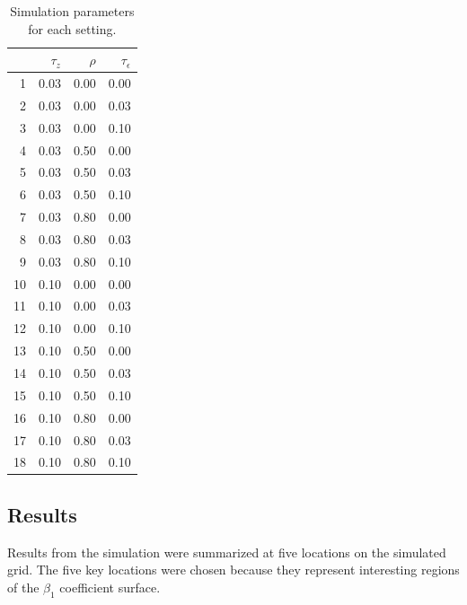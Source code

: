 \documentclass[authoryear, review, 11pt]{elsarticle}
\begin{document}
	
	
\begin{table}[h!]
	\begin{center}
	\begin{tabular}{rrrr}
		\hline
		& $\tau_z$ & $\rho$ & $\tau_{\epsilon}$ \\ 
		\hline
		1 & 0.03 & 0.00 & 0.00 \\ 
		2 & 0.03 & 0.00 & 0.03 \\ 
		3 & 0.03 & 0.00 & 0.10 \\ 
		4 & 0.03 & 0.50 & 0.00 \\ 
		5 & 0.03 & 0.50 & 0.03 \\ 
		6 & 0.03 & 0.50 & 0.10 \\ 
		7 & 0.03 & 0.80 & 0.00 \\ 
		8 & 0.03 & 0.80 & 0.03 \\ 
		9 & 0.03 & 0.80 & 0.10 \\ 
		10 & 0.10 & 0.00 & 0.00 \\ 
		11 & 0.10 & 0.00 & 0.03 \\ 
		12 & 0.10 & 0.00 & 0.10 \\ 
		13 & 0.10 & 0.50 & 0.00 \\ 
		14 & 0.10 & 0.50 & 0.03 \\ 
		15 & 0.10 & 0.50 & 0.10 \\ 
		16 & 0.10 & 0.80 & 0.00 \\ 
		17 & 0.10 & 0.80 & 0.03 \\ 
		18 & 0.10 & 0.80 & 0.10
	\end{tabular}
	\end{center}
	\caption{Simulation parameters for each setting.\label{table:simulation_settings}}
\end{table}
	
	\subsection{Results}
	Results from the simulation were summarized at five locations on the simulated grid. The five key locations were chosen because they represent interesting regions of the $\beta_1$ coefficient surface.
	
\end{document}
